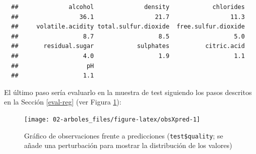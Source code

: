 \documentclass[
]{book}
\newenvironment{Shaded}{\begin{snugshade}}{\end{snugshade}}
\newcommand{\AttributeTok}[1]{\textcolor[rgb]{0.77,0.63,0.00}{#1}}
\newcommand{\CommentTok}[1]{\textcolor[rgb]{0.56,0.35,0.01}{\textit{#1}}}
\newcommand{\DecValTok}[1]{\textcolor[rgb]{0.00,0.00,0.81}{#1}}
\newcommand{\FunctionTok}[1]{\textcolor[rgb]{0.00,0.00,0.00}{#1}}
\newcommand{\NormalTok}[1]{#1}
\newcommand{\OtherTok}[1]{\textcolor[rgb]{0.56,0.35,0.01}{#1}}
\newcommand{\SpecialCharTok}[1]{\textcolor[rgb]{0.00,0.00,0.00}{#1}}
\newcommand{\StringTok}[1]{\textcolor[rgb]{0.31,0.60,0.02}{#1}}
\theoremstyle{break}
\theoremstyle{nonumberplain}
\renewcommand{\CommentTok}[1]{\textcolor[rgb]{0.41,0.41,0.41}{\texttt{#1}}}
\begin{document}
\begin{Shaded}
\end{Shaded}

\begin{verbatim}
  ##              alcohol              density            chlorides 
  ##                 36.1                 21.7                 11.3 
  ##     volatile.acidity total.sulfur.dioxide  free.sulfur.dioxide 
  ##                  8.7                  8.5                  5.0 
  ##       residual.sugar            sulphates          citric.acid 
  ##                  4.0                  1.9                  1.1 
  ##                   pH 
  ##                  1.1
\end{verbatim}

El último paso sería evaluarlo en la muestra de test siguiendo los pasos descritos en la Sección \ref{eval-reg} (ver Figura \ref{fig:obsXpred}):



\begin{Shaded}
\end{Shaded}

\begin{figure}[!htb]

{\centering \texttt{[image: 02-arboles\_files/figure-latex/obsXpred-1]} 

}

\caption{Gráfico de observaciones frente a predicciones (\texttt{test\$quality}; se añade una perturbación para mostrar la distribución de los valores)}\label{fig:obsXpred}
\end{figure}
\end{document}
